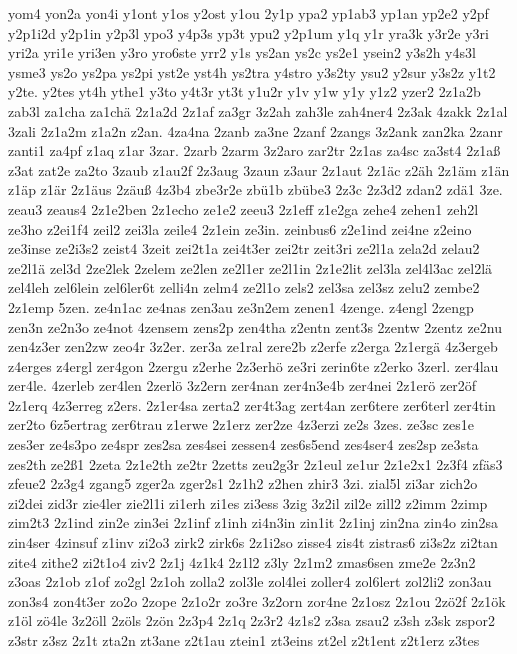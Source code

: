 {yom4
yon2a
yon4i
y1ont
y1os
y2ost
y1ou
2y1p
ypa2
yp1ab3
yp1an
yp2e2
y2pf
y2p1i2d
y2p1in
y2p3l
ypo3
y4p3s
yp3t
ypu2
y2p1um
y1q
y1r
yra3k
y3r2e
y3ri
yri2a
yri1e
yri3en
y3ro
yro6ste
yrr2
y1s
ys2an
ys2c
ys2e1
ysein2
y3s2h
y4s3l
ysme3
ys2o
ys2pa
ys2pi
yst2e
yst4h
ys2tra
y4stro
y3s2ty
ysu2
y2sur
y3s2z
y1t2
y2te.
y2tes
yt4h
ythe1
y3to
y4t3r
yt3t
y1u2r
y1v
y1w
y1y
y1z2
yzer2
2z1a2b
zab3l
za1cha
za1chä
2z1a2d
2z1af
za3gr
3z2ah
zah3le
zah4ner4
2z3ak
4zakk
2z1al
3zali
2z1a2m
z1a2n
z2an.
4za4na
2zanb
za3ne
2zanf
2zangs
3z2ank
zan2ka
2zanr
zanti1
za4pf
z1aq
z1ar
3zar.
2zarb
2zarm
3z2aro
zar2tr
2z1as
za4sc
za3st4
2z1aß
z3at
zat2e
za2to
3zaub
z1au2f
2z3aug
3zaun
z3aur
2z1aut
2z1äc
z2äh
2z1äm
z1än
z1äp
z1är
2z1äus
2zäuß
4z3b4
zbe3r2e
zbü1b
zbübe3
2z3c
2z3d2
zdan2
zdä1
3ze.
zeau3
zeaus4
2z1e2ben
2z1echo
ze1e2
zeeu3
2z1eff
z1e2ga
zehe4
zehen1
zeh2l
ze3ho
z2ei1f4
zeil2
zei3la
zeile4
2z1ein
ze3in.
zeinbus6
z2e1ind
zei4ne
z2eino
ze3inse
ze2i3s2
zeist4
3zeit
zei2t1a
zei4t3er
zei2tr
zeit3ri
ze2l1a
zela2d
zelau2
ze2l1ä
zel3d
2ze2lek
2zelem
ze2len
ze2l1er
ze2l1in
2z1e2lit
zel3la
zel4l3ac
zel2lä
zel4leh
zel6lein
zel6ler6t
zelli4n
zelm4
ze2l1o
zels2
zel3sa
zel3sz
zelu2
zembe2
2z1emp
5zen.
ze4n1ac
ze4nas
zen3au
ze3n2em
zenen1
4zenge.
z4engl
2zengp
zen3n
ze2n3o
ze4not
4zensem
zens2p
zen4tha
z2entn
zent3s
2zentw
2zentz
ze2nu
zen4z3er
zen2zw
zeo4r
3z2er.
zer3a
ze1ral
zere2b
z2erfe
z2erga
2z1ergä
4z3ergeb
z4erges
z4ergl
zer4gon
2zergu
z2erhe
2z3erhö
ze3ri
zerin6te
z2erko
3zerl.
zer4lau
zer4le.
4zerleb
zer4len
2zerlö
3z2ern
zer4nan
zer4n3e4b
zer4nei
2z1erö
zer2öf
2z1erq
4z3erreg
z2ers.
2z1er4sa
zerta2
zer4t3ag
zert4an
zer6tere
zer6terl
zer4tin
zer2to
6z5ertrag
zer6trau
z1erwe
2z1erz
zer2ze
4z3erzi
ze2s
3zes.
ze3sc
zes1e
zes3er
ze4s3po
ze4spr
zes2sa
zes4sei
zessen4
zes6s5end
zes4ser4
zes2sp
ze3sta
zes2th
ze2ß1
2zeta
2z1e2th
ze2tr
2zetts
zeu2g3r
2z1eul
ze1ur
2z1e2x1
2z3f4
zfäs3
zfeue2
2z3g4
zgang5
zger2a
zger2s1
2z1h2
z2hen
zhir3
3zi.
zial5l
zi3ar
zich2o
zi2dei
zid3r
zie4ler
zie2l1i
zi1erh
zi1es
zi3ess
3zig
3z2il
zil2e
zill2
z2imm
2zimp
zim2t3
2z1ind
zin2e
zin3ei
2z1inf
z1inh
zi4n3in
zin1it
2z1inj
zin2na
zin4o
zin2sa
zin4ser
4zinsuf
z1inv
zi2o3
zirk2
zirk6s
2z1i2so
zisse4
zis4t
zistras6
zi3s2z
zi2tan
zite4
zithe2
zi2t1o4
ziv2
2z1j
4z1k4
2z1l2
z3ly
2z1m2
zmas6sen
zme2e
2z3n2
z3oas
2z1ob
z1of
zo2gl
2z1oh
zolla2
zol3le
zol4lei
zoller4
zol6lert
zol2li2
zon3au
zon3s4
zon4t3er
zo2o
2zope
2z1o2r
zo3re
3z2orn
zor4ne
2z1osz
2z1ou
2zö2f
2z1ök
z1öl
zö4le
3z2öll
2zöls
2zön
2z3p4
2z1q
2z3r2
4z1s2
z3sa
zsau2
z3sh
z3sk
zspor2
z3str
z3sz
2z1t
zta2n
zt3ane
z2t1au
ztein1
zt3eins
zt2el
z2t1ent
z2t1erz
z3tes
}

